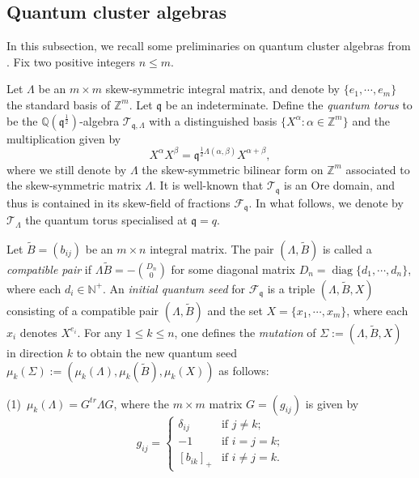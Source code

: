 \documentclass[reqno,12pt]{amsart}
\numberwithin{equation}{section}
\theoremstyle{plain} %
\theoremstyle{definition} %
\begin{document}
\subsection{Quantum cluster algebras}\label{ss:quantum-cluster-algebras}
In this subsection, we recall some preliminaries on quantum cluster algebras from \cite{BZ05}. Fix two positive integers $n\leq m$.

Let $\Lambda$ be an $m\times m$ skew-symmetric integral matrix, and denote by $\{e_1,\cdots,e_m\}$ the standard basis of $\mathbb{Z}^{m}$. Let $\mathfrak{q}$ be an indeterminate.
Define the {\em quantum torus} to be the $\mathbb{Q}(\mathfrak{q}^{\frac{1}{2}})$-algebra $\mathcal{T}_{\mathfrak{q},\Lambda}$ with
a distinguished basis $\{X^{\alpha}: {\alpha}\in \mathbb{Z}^{m}\}$ and the
multiplication given by
\begin{equation}\label{ljhtorus}X^{\alpha} X^{\beta}=\mathfrak{q}^{\frac{1}{2}\Lambda(\alpha,\beta)}X^{\alpha+\beta},\end{equation}
where we still denote by $\Lambda$ the skew-symmetric bilinear form on $\mathbb{Z}^{m}$ associated to the skew-symmetric matrix $\Lambda$. It is well-known that $\mathcal{T}_{\mathfrak{q}}$ is an Ore domain, and thus is contained in its
skew-field of fractions $\mathcal{F}_{\mathfrak{q}}$. In what follows, we denote by $\mathcal{T}_{\Lambda}$ the quantum torus specialised at $\mathfrak{q}=q$.

Let $\widetilde{B}=(b_{ij})$ be an $m\times n$ integral matrix.  The pair
$(\Lambda, \widetilde{B})$ is called a {\em compatible pair} if $\Lambda\widetilde{B}=-{D_n\choose 0}$ for some diagonal matrix
$D_n=\operatorname{diag}\{d_1,\cdots, d_n\}$, where each $d_i\in\mathbb{N^+}$. An {\em initial  quantum seed} for $\mathcal{F}_{\mathfrak{q}}$ is a triple
$(\Lambda, \widetilde{B}, X)$  consisting of a compatible pair $(\Lambda,\widetilde{B})$ and the set  $X=\{x_1,\cdots,x_m\}$, where each $x_i$ denotes $X^{{ e}_i}$. For any $1\leq k\leq n$, one defines the {\em mutation} of $\Sigma:=(\Lambda, \widetilde{B}, X)$ in direction $k$ to obtain the new quantum seed $\mu_k(\Sigma):=(\mu_k(\Lambda),\mu_k(\widetilde{B}),\mu_k(X))$ as follows:

(1)\ $\mu_k(\Lambda)=G^{tr}\Lambda G$, where the
$m\times m$ matrix $G=(g_{ij})$ is given by
\[g_{ij}=\begin{cases}
\delta_{ij} & \text{if $j\ne k$;}\\
-1 & \text{if $i=j=k$;}\\
[b_{ik}]_{+} & \text{if $i\ne j = k$.}
\end{cases}
\]
\end{document}
